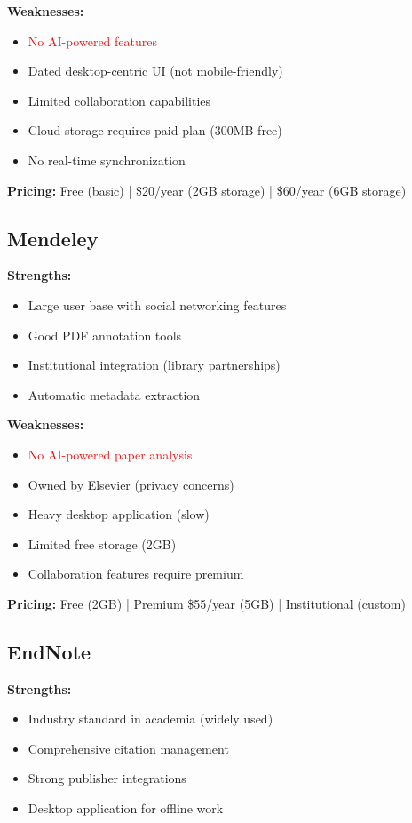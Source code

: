 \textbf{Weaknesses:}
\begin{itemize}[leftmargin=*]
    \item \textcolor{red}{No AI-powered features}
    \item Dated desktop-centric UI (not mobile-friendly)
    \item Limited collaboration capabilities
    \item Cloud storage requires paid plan (300MB free)
    \item No real-time synchronization
\end{itemize}

\textbf{Pricing:} Free (basic) | \$20/year (2GB storage) | \$60/year (6GB storage)

\subsection{Mendeley}

\textbf{Strengths:}
\begin{itemize}[leftmargin=*]
    \item Large user base with social networking features
    \item Good PDF annotation tools
    \item Institutional integration (library partnerships)
    \item Automatic metadata extraction
\end{itemize}

\textbf{Weaknesses:}
\begin{itemize}[leftmargin=*]
    \item \textcolor{red}{No AI-powered paper analysis}
    \item Owned by Elsevier (privacy concerns)
    \item Heavy desktop application (slow)
    \item Limited free storage (2GB)
    \item Collaboration features require premium
\end{itemize}

\textbf{Pricing:} Free (2GB) | Premium \$55/year (5GB) | Institutional (custom)

\subsection{EndNote}

\textbf{Strengths:}
\begin{itemize}[leftmargin=*]
    \item Industry standard in academia (widely used)
    \item Comprehensive citation management
    \item Strong publisher integrations
    \item Desktop application for offline work
\end{itemize}

